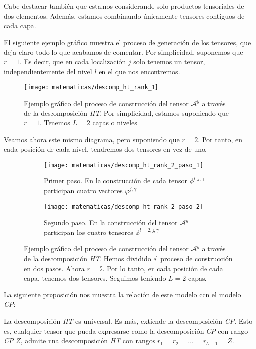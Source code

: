 Cabe destacar también que estamos considerando solo productos tensoriales de dos elementos. Además, estamos combinando únicamente tensores contiguos de cada capa.

El siguiente ejemplo gráfico muestra el proceso de generación de los tensores, que deja claro todo lo que acabamos de comentar. Por simplicidad, suponemos que $r = 1$. Es decir, que en cada localización $j$ solo tenemos un tensor, independientemente del nivel $l$ en el que nos encontremos.

\begin{figure}[H]
	\centering
	\texttt{[image: matematicas/descomp\_ht\_rank\_1]}
	\caption{Ejemplo gráfico del proceso de construcción del tensor $\mathcal{A}^y$ a través de la descomposición \textit{HT}. Por simplicidad, estamos suponiendo que $r = 1$. Tenemos $L = 2$ capas o niveles}
	\label{img:diagrama_ht_simple}
\end{figure}

Veamos ahora este mismo diagrama, pero suponiendo que $r = 2$. Por tanto, en cada posición de cada nivel, tendremos dos tensores en vez de uno.

\begin{figure}[H]
	\centering
	\ajustarsubcaptions
	\begin{subfigure}{.5\textwidth}
		\centering
		\texttt{[image: matematicas/descomp\_ht\_rank\_2\_paso\_1]}
		\caption{Primer paso. En la construcción de cada tensor $\phi^{l, j, \gamma}$ participan cuatro vectores $\varphi^{j, \gamma}$}
	\end{subfigure}%
	\begin{subfigure}{.5\textwidth}
		\centering
		\texttt{[image: matematicas/descomp\_ht\_rank\_2\_paso\_2]}
		\caption{Segundo paso. En la construcción del tensor $\mathcal{A}^y$ participan los cuatro tensores $\phi^{l=2, j, \gamma}$}
	\end{subfigure}
	\caption{Ejemplo gráfico del proceso de construcción del tensor $\mathcal{A}^y$ a través de la descomposición \textit{HT}. Hemos dividido el proceso de construcción en dos pasos. Ahora $r = 2$. Por lo tanto, en cada posición de cada capa, tenemos dos tensores. Seguimos teniendo $L = 2$ capas. }
	\label{img:diagrama_ht_complejo}
\end{figure}

La siguiente proposición nos muestra la relación de este modelo con el modelo \textit{CP}:

\begin{proposicion}
	La descomposición \textit{HT} es universal. Es más, extiende la descomposición \textit{CP}. Esto es, cualquier tensor que pueda expresarse como la descomposición \textit{CP} con rango \textit{CP} $Z$, admite una descomposición \textit{HT} con rangos $r_1 = r_2 = \ldots = r_{L - 1} = Z$.
\end{proposicion}

